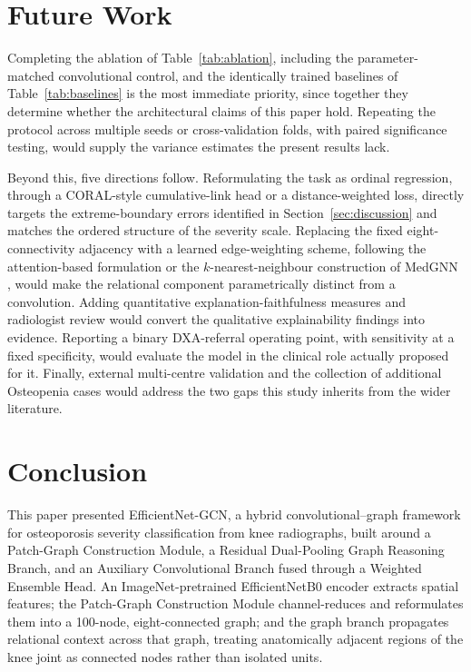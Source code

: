 \documentclass[journal]{IEEEtran}
\begin{document}
\section{Future Work}
\label{sec:futurework}
Completing the ablation of Table~\ref{tab:ablation}, including the
parameter-matched convolutional control, and the identically trained baselines
of Table~\ref{tab:baselines} is the most immediate priority, since together they
determine whether the architectural claims of this paper hold. Repeating the
protocol across multiple seeds or cross-validation folds, with paired
significance testing, would supply the variance estimates the present results
lack.

Beyond this, five directions follow. Reformulating the task as ordinal
regression, through a CORAL-style cumulative-link head or a distance-weighted
loss, directly targets the extreme-boundary errors identified in
Section~\ref{sec:discussion} and matches the ordered structure of the severity
scale. Replacing the fixed eight-connectivity adjacency with a learned
edge-weighting scheme, following the attention-based formulation
\cite{velickovic2018graph} or the $k$-nearest-neighbour construction of MedGNN
\cite{ye2025medgnn}, would make the relational component parametrically distinct
from a convolution. Adding quantitative explanation-faithfulness measures and
radiologist review would convert the qualitative explainability findings into
evidence. Reporting a binary DXA-referral operating point, with sensitivity at a
fixed specificity, would evaluate the model in the clinical role actually
proposed for it. Finally, external multi-centre validation and the collection of
additional Osteopenia cases would address the two gaps this study inherits from
the wider literature.

\section{Conclusion} \label{conclusion}
This paper presented EfficientNet-GCN, a hybrid convolutional--graph framework
for osteoporosis severity classification from knee radiographs, built around a
Patch-Graph Construction Module, a Residual Dual-Pooling Graph Reasoning Branch,
and an Auxiliary Convolutional Branch fused through a Weighted Ensemble Head. An
ImageNet-pretrained EfficientNetB0 encoder extracts spatial features; the
Patch-Graph Construction Module channel-reduces and reformulates them into a
100-node, eight-connected graph; and the graph branch propagates relational
context across that graph, treating anatomically adjacent regions of the knee
joint as connected nodes rather than isolated units.
\end{document}
